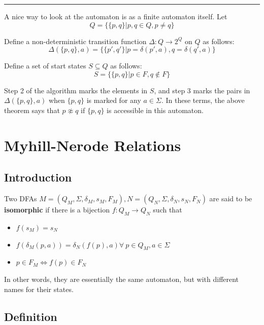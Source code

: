 \documentclass{report}
\newcommand{\hr}{\hrule\vspace{4mm}}
\begin{document}

\hr

A nice way to look at the automaton is as a finite automaton itself. Let
$$
  Q =\{ \{p,q\} | p,q \in Q, p \neq q \}
$$

Define a non-deterministic transition function $\Delta: Q \rightarrow 2^Q$ on $Q$ as follows:
$$
  \Delta(\{p,q\},a) = \{ \{ p',q' \} | p = \delta(p',a), q = \delta(q',a) \}
$$

Define a set of start states $S \subseteq Q$ as follows:
$$
  S = \{ \{p,q\} | p \in F, q \notin F \}
$$

Step 2 of the algorithm marks the elements in $S$, and step 3 marks the pairs in $\Delta(\{p,q\},a)$ when $\{p,q\}$ is marked for any $a \in \Sigma$. In these terms, the above theorem says that $p \not\approx q$ if $\{p,q\}$ is accessible in this automaton.


\chapter{Myhill-Nerode Relations}

\section{Introduction}

Two DFAs $M = (Q_M,\Sigma,\delta_M,s_M,F_M), N = (Q_N,\Sigma,\delta_N,s_N,F_N)$ are said to be \textbf{isomorphic} if there is a bijection $f: Q_M \rightarrow Q_N$ such that
\begin{itemize}
  \item $f(s_M) = s_N$
  \item $f(\delta_M(p,a)) = \delta_N(f(p),a) \forall \ p \in Q_M, a \in \Sigma$
  \item $p \in F_M \iff f(p) \in F_N$
\end{itemize}

In other words, they are essentially the same automaton, but with different names for their states.

\section{Definition}
\end{document}
